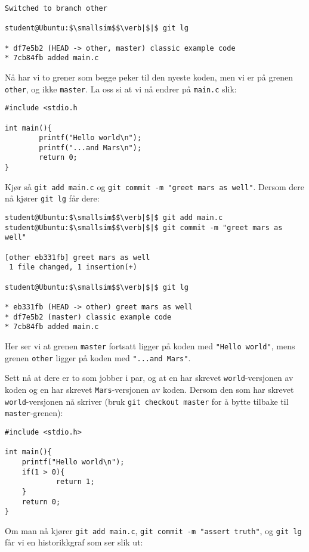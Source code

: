 \begin{alphasection}
\begin{lstlisting}[mathescape=true]
Switched to branch other

student@Ubuntu:$\smallsim$$\verb|$|$ git lg

* df7e5b2 (HEAD -> other, master) classic example code
* 7cb84fb added main.c
\end{lstlisting}

Nå har vi to grener som begge peker til den nyeste koden, men vi er på
grenen \verb|other|, og ikke \verb|master|. La oss si at vi nå endrer på \verb|main.c| slik:

\begin{lstlisting}
#include <stdio.h

int main(){
        printf("Hello world\n");
        printf("...and Mars\n");
        return 0;
}
\end{lstlisting}


Kjør så \verb|git add main.c| og \verb|git commit -m "greet mars as well"|. Dersom dere nå kjører \verb|git lg| får dere:

\begin{lstlisting}[mathescape=true]
student@Ubuntu:$\smallsim$$\verb|$|$ git add main.c
student@Ubuntu:$\smallsim$$\verb|$|$ git commit -m "greet mars as well"

[other eb331fb] greet mars as well
 1 file changed, 1 insertion(+)

student@Ubuntu:$\smallsim$$\verb|$|$ git lg

* eb331fb (HEAD -> other) greet mars as well
* df7e5b2 (master) classic example code
* 7cb84fb added main.c
\end{lstlisting}


Her ser vi at grenen \verb|master| fortsatt ligger på koden med \verb|"Hello world"|, mens grenen \verb|other| ligger på koden med \verb|"...and Mars"|.

Sett nå at dere er to som jobber i par, og at en har skrevet \verb|world|-versjonen av koden og en har skrevet \verb|Mars|-versjonen av koden. Dersom den som har skrevet \verb|world|-versjonen nå skriver (bruk \verb|git checkout master| for å bytte tilbake til \verb|master|-grenen):



\begin{lstlisting}
#include <stdio.h>

int main(){
    printf("Hello world\n");
    if(1 > 0){
            return 1;
    }
    return 0;
}
\end{lstlisting}

Om man nå kjører \verb|git add main.c|, \verb|git commit -m "assert truth"|, og \verb|git lg| får vi en historikkgraf som ser slik ut:


\end{alphasection}
